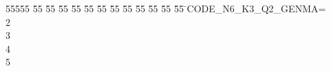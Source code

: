 %
%
\begin{tabbing}
55555 \= 55 \= 55 \= 55 \= 55 \= 55 \= 55 \= 55 \= 55 \= 55 \= 55 \= 55 \= 55 \= \>CODE\_N6\_K3\_Q2\_GENMA=\\[0pt]
2\\[0pt]
3\\[0pt]
4\\[0pt]
5\>\end{tabbing}
